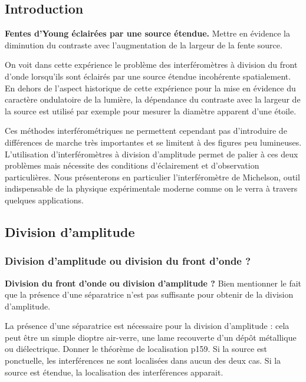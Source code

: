 \subsection*{Introduction}

\begin{experience}
\textbf{Fentes d'Young éclairées par une source étendue.}
Mettre en évidence la diminution du contraste avec l'augmentation de la largeur de la fente source.
\end{experience}

On voit dans cette expérience le problème des interféromètres à division du front d'onde lorsqu'ils sont éclairés par une source étendue incohérente spatialement.
En dehors de l'aspect historique de cette expérience pour la mise en évidence du caractère ondulatoire de la lumière, la dépendance du contraste avec la largeur de la source est utilisé par exemple pour mesurer la diamètre apparent d'une étoile.

Ces méthodes interférométriques ne permettent cependant pas d'introduire de différences de marche très importantes et se limitent à des figures peu lumineuses.
L'utilisation d'interféromètres à division d'amplitude permet de palier à ces deux problèmes mais nécessite des conditions d'éclairement et d'observation particulières.
Nous présenterons en particulier l'interféromètre de Michelson, outil indispensable de la physique expérimentale moderne comme on le verra à travers quelques applications.

\subsection{Division d'amplitude}

\subsubsection{Division d'amplitude ou division du front d'onde ?}

\begin{slide}
\textbf{Division du front d'onde ou division d'amplitude ?}
Bien mentionner le fait que la présence d'une séparatrice n'est pas suffisante pour obtenir de la division d'amplitude.
\end{slide}

La présence d'une séparatrice est nécessaire pour la division d'amplitude : cela peut être un simple dioptre air-verre, une lame recouverte d'un dépôt métallique ou diélectrique.
Donner le théorème de localisation \cite{Mauras2001} p159.
Si la source est ponctuelle, les interférences ne sont localisées dans aucun des deux cas.
Si la source est étendue, la localisation des interférences apparait.

